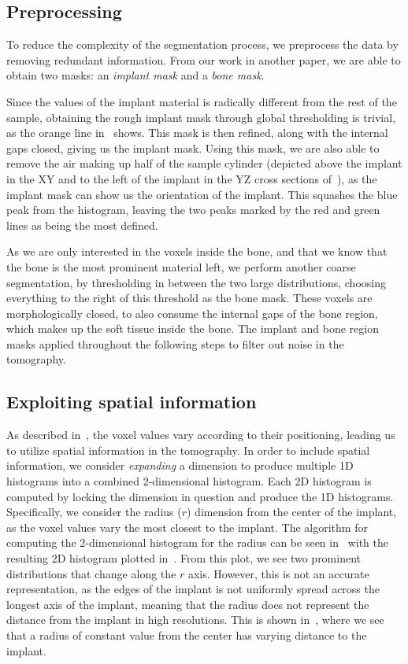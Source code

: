 \subsection{Preprocessing}\label{sec:preprocess}
To reduce the complexity of the segmentation process, we preprocess the data by removing redundant information.
From our work in another paper, we are able to obtain two masks: an \textit{implant mask} and a \textit{bone mask}.

Since the values of the implant material is radically different from the rest of the sample, obtaining the rough implant mask through global thresholding is trivial, as the orange line in~ shows.
This mask is then refined, along with the internal gaps closed, giving us the implant mask. 
Using this mask, we are also able to remove the air making up half of the sample cylinder (depicted above the implant in the XY and to the left of the implant in the YZ cross sections of~), as the implant mask can show us the orientation of the implant. This squashes the blue peak from the histogram, leaving the two peaks marked by the red and green lines as being the most defined. 

As we are only interested in the voxels inside the bone, and that we know that the bone is the most prominent material left, we perform another coarse segmentation, by thresholding in between the two large distributions, choosing everything to the right of this threshold as the bone mask. These voxels are morphologically closed, to also consume the internal gaps of the bone region, which makes up the soft tissue inside the bone. The implant and bone region masks applied throughout the following steps to filter out noise in the tomography.

\subsection{Exploiting spatial information}
As described in~, the voxel values vary according to their positioning, leading us to utilize spatial information in the tomography. 
In order to include spatial information, we consider \textit{expanding} a dimension to produce multiple 1D histograms into a combined 2-dimensional histogram.
Each 2D histogram is computed by locking the dimension in question and produce the 1D histograms.
Specifically, we consider the radius ($r$) dimension from the center of the implant, as the voxel values vary the most closest to the implant. 
The algorithm for computing the 2-dimensional histogram for the radius can be seen in~ with the resulting 2D histogram plotted in~.
From this plot, we see two prominent distributions that change along the $r$ axis.
However, this is not an accurate representation, as the edges of the implant is not uniformly spread across the longest axis of the implant, meaning that the radius does not represent the distance from the implant in high resolutions. This is shown in~, where we see that a radius of constant value from the center has varying distance to the implant.

